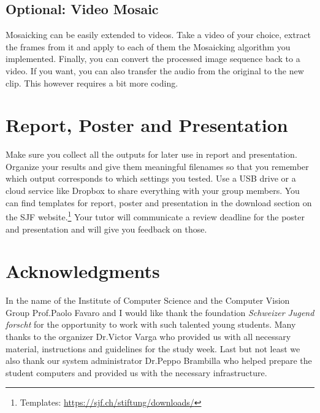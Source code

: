 \documentclass[a4paper]{article}
\begin{document}
		
	\subsection{Optional: Video Mosaic}
		Mosaicking can be easily extended to videos. 
		Take a video of your choice, extract the frames from it and apply to each of them the Mosaicking algorithm you implemented.
		Finally, you can convert the processed image sequence back to a video. 
		If you want, you can also transfer the audio from the original to the new clip. 
		This however requires a bit more coding.
		

\section{Report, Poster and Presentation}

	Make sure you collect all the outputs for later use in report and presentation.
	Organize your results and give them meaningful filenames so that you remember which output corresponds to which settings you tested.
	Use a USB drive or a cloud service like Dropbox to share everything with your group members.
	You can find templates for report, poster and presentation in the download section on the SJF website.\footnote{
	Templates: \url{https://sjf.ch/stiftung/downloads/}}
	Your tutor will communicate a review deadline for the poster and presentation and will give you feedback on those.
	

\section{Acknowledgments}
	In the name of the Institute of Computer Science and the Computer Vision Group Prof.\@ Paolo Favaro and I would like thank the foundation \emph{Schweizer Jugend forscht} for the opportunity to work with such talented young students. 
	Many thanks to the organizer Dr.\@ Victor Varga who provided us with all necessary material, instructions and guidelines for the study week.
	Last but not least we also thank our system administrator Dr.\@ Peppo Brambilla who helped prepare the student computers and provided us with the necessary infrastructure.
	
\end{document}
